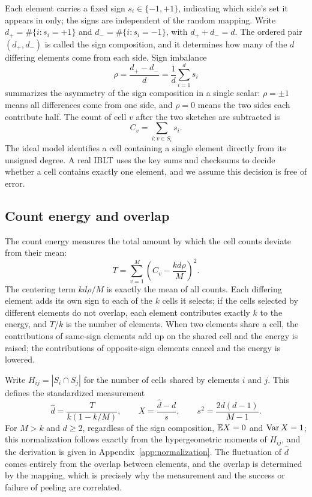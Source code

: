Each element carries a fixed sign $s_i\in\{-1,+1\}$, indicating which side's set it appears in only; the signs are independent of the random mapping. Write
$d_+=\#\{i:s_i=+1\}$ and $d_-=\#\{i:s_i=-1\}$, with $d_++d_-=d$. The ordered pair $(d_+,d_-)$
is called the sign composition, and it determines how many of the $d$ differing elements come from each side. Sign imbalance
\begin{equation*}
\rho=\frac{d_+-d_-}{d}=\frac1d\sum_{i=1}^d s_i
\end{equation*}
summarizes the asymmetry of the sign composition in a single scalar: $\rho=\pm1$ means all differences come from one side, and $\rho=0$
means the two sides each contribute half. The count of cell $v$ after the two sketches are subtracted is
\begin{equation*}
C_v=\sum_{i:v\in S_i}s_i.
\end{equation*}
The ideal model identifies a cell containing a single element directly from its unsigned degree. A real IBLT uses the key sums and checksums to decide whether a cell contains exactly one element,
and we assume this decision is free of error.

\subsection{Count energy and overlap}
The count energy measures the total amount by which the cell counts deviate from their mean:
\begin{equation}
T=\sum_{v=1}^M\left(C_v-\frac{kd\rho}{M}\right)^2.\label{eq:T}
\end{equation}
The centering term $kd\rho/M$ is exactly the mean of all counts. Each differing element adds its own sign to each of the $k$
cells it selects; if the cells selected by different elements do not overlap, each element contributes exactly $k$ to the energy, and $T/k$ is the number of elements. When two elements share a cell, the contributions of same-sign elements add up on the shared cell
and the energy is raised; the contributions of opposite-sign elements cancel and the energy is lowered.

Write $H_{ij}=|S_i\cap S_j|$ for the number of cells shared by elements $i$ and $j$. This defines the standardized
measurement
\begin{equation}
\widehat d=\frac{T}{k(1-k/M)},\qquad
X=\frac{\widehat d-d}{s},\qquad
s^2=\frac{2d(d-1)}{M-1}.\label{eq:measurement}
\end{equation}
For $M>k$ and $d\ge2$, regardless of the sign composition, $\mathbb E X=0$ and $\operatorname{Var} X=1$; this normalization follows exactly from
the hypergeometric moments of $H_{ij}$, and the derivation is given in Appendix~\ref{app:normalization}. The fluctuation of $\widehat d$
comes entirely from the overlap between elements, and the overlap is determined by the mapping, which is precisely why the measurement and the success or failure of peeling are correlated.

